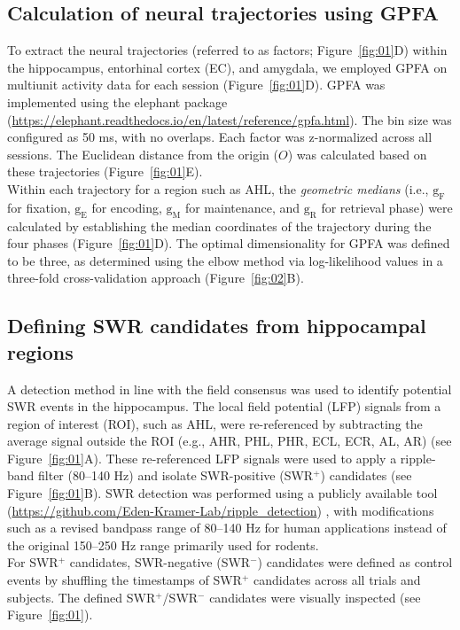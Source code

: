 \documentclass[final,3p,times,twocolumn]{elsarticle}
\begin{document}
\subsection{Calculation of neural trajectories using GPFA}
To extract the neural trajectories (referred to as factors; Figure~\ref{fig:01}D) within the hippocampus, entorhinal cortex (EC), and amygdala, we employed GPFA \cite{yu_gaussian-process_2009} on multiunit activity data for each session (Figure~\ref{fig:01}D). GPFA was implemented using the elephant package (\url{https://elephant.readthedocs.io/en/latest/reference/gpfa.html}). The bin size was configured as 50 ms, with no overlaps. Each factor was z-normalized across all sessions. The Euclidean distance from the origin ($O$) was calculated based on these trajectories (Figure~\ref{fig:01}E).
\\
\indent
Within each trajectory for a region such as AHL, the \textit{geometric medians} (i.e., $\mathrm{g_{F}}$ for fixation, $\mathrm{g_{E}}$ for encoding, $\mathrm{g_{M}}$ for maintenance, and $\mathrm{g_{R}}$ for retrieval phase) were calculated by establishing the median coordinates of the trajectory during the four phases (Figure~\ref{fig:01}D). The optimal dimensionality for GPFA was defined to be three, as determined using the elbow method via log-likelihood values in a three-fold cross-validation approach (Figure~\ref{fig:02}B).

\subsection{Defining SWR candidates from hippocampal regions}
A detection method in line with the field consensus \cite{liu_consensus_2022} was used to identify potential SWR events in the hippocampus. The local field potential (LFP) signals from a region of interest (ROI), such as AHL, were re-referenced by subtracting the average signal outside the ROI (e.g., AHR, PHL, PHR, ECL, ECR, AL, AR) (see Figure~\ref{fig:01}A). These re-referenced LFP signals were used to apply a ripple-band filter (80--140 Hz) and isolate SWR-positive (SWR$^+$) candidates (see Figure~\ref{fig:01}B). SWR detection was performed using a publicly available tool (\url{https://github.com/Eden-Kramer-Lab/ripple_detection}) \cite{kay_hippocampal_2016}, with modifications such as a revised bandpass range of 80--140 Hz for human applications \cite{norman_hippocampal_2019,norman_hippocampal_2021} instead of the original 150--250 Hz range primarily used for rodents.
\\
\indent
For SWR$^+$ candidates, SWR-negative (SWR$^-$) candidates were defined as control events by shuffling the timestamps of SWR$^+$ candidates across all trials and subjects. The defined SWR$^+$/SWR$^-$ candidates were visually inspected (see Figure~\ref{fig:01}).
\end{document}

